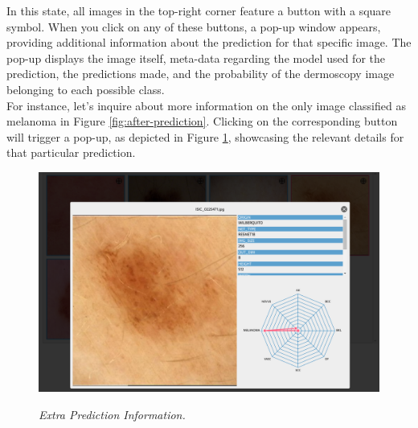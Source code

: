 In this state, all images in the top-right corner feature a button with a
square symbol. When you click on any of these buttons, a pop-up window appears,
providing additional information about the prediction for that specific image.
The pop-up displays the image itself, meta-data regarding the model used for
the prediction, the predictions made, and the probability of the dermoscopy
image belonging to each possible class. \\

For instance, let's inquire about more information on the only image classified
as melanoma in Figure \ref{fig:after-prediction}. Clicking on the
corresponding button will trigger a pop-up, as depicted in Figure
\ref{fig:extra-inf-popup}, showcasing the relevant details for that particular
prediction.

\begin{figure}[H]
  \centering
  \begin{adjustbox}{width=\textwidth, trim={0.05cm 0cm 0.25cm 0cm}, clip}
    \includegraphics[]{imatges/results/extra-inf-popup.png}
  \end{adjustbox}
  \caption[Extra Prediction Information]{\textit{Extra Prediction Information.}}
  {\label{fig:extra-inf-popup}}
\end{figure}
